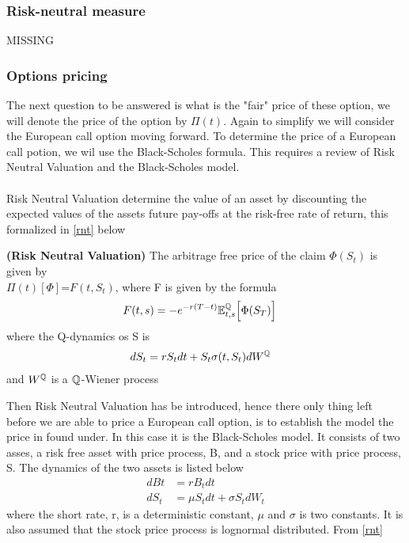 \subsubsection{Risk-neutral measure}
MISSING
\subsubsection{Options pricing}
The next question to be answered is what is the "fair" price of these option, we will denote the price of
the option by $\Pi(t)$. Again to simplify we will consider
the European call option moving forward. To determine the price of a European call potion, we wil use the 
Black-Scholes formula. This requires a review of Risk Neutral Valuation and the Black-Scholes model.
\\\\
Risk Neutral Valuation determine the value of an asset by discounting the expected values of the assets future 
pay-offs at the risk-free rate of return, this formalized in \autoref{rnt} below
\begin{theorem}
    \textbf{(Risk Neutral Valuation)} The arbitrage free price of the claim $\Phi(S_t)$ is given by \\
    $\Pi(t)[\Phi]$=$F(t,S_t)$, where F is given by the formula 
    \begin{align*}
        F(t,s) &= -e^{-r(T-t)} \mathbb{E}_{t,s}^{\mathbb{Q}} \Big[\Phi(S_T)\Big]
    \end{align*}
    where the Q-dynamics os S is
    \begin{align*}
        dS_t & = r S_t dt + S_t \sigma(t,S_t) dW^{\mathbb{Q}} 
    \end{align*}
    and $W^{\mathbb{Q}}$ is a $\mathbb{Q}$-Wiener process \cite{Bjork}
    \label{rnt}
\end{theorem}
\noindent 
Then Risk Neutral Valuation has be introduced, hence there only thing left before we are able to price a 
European call option, is to establish the model the price in found under. In this case it is the Black-Scholes model.
It consists of two asses, a risk free asset with price process, B, and a stock price with price process, S.
The dynamics of the two assets is listed below
\begin{align*}
    dBt & = rB_t dt \\
    dS_t &= \mu S_t dt + \sigma S_t dW_t
\end{align*}
where the short rate, r, is  a deterministic constant,  $\mu$ and $\sigma$ is two constants. It is also assumed
that the stock price process is lognormal distributed. From \autoref{rnt}
